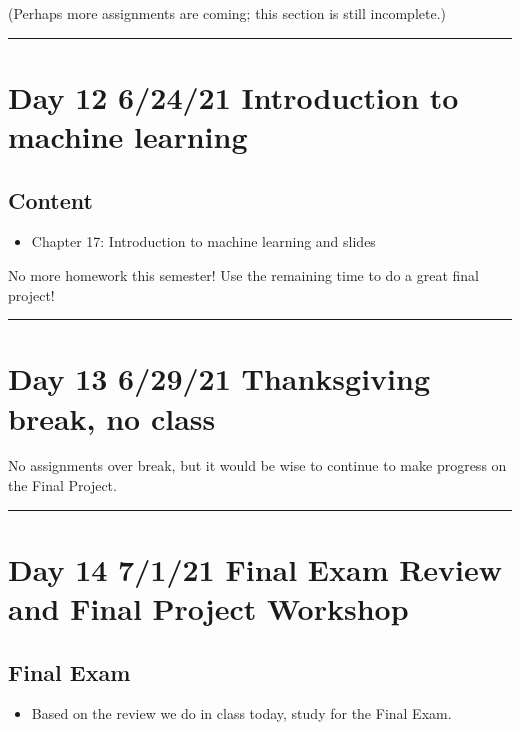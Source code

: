 \documentclass[letterpaper,10pt,english]{jupyterBook}
\begin{document}
\sphinxAtStartPar
(Perhaps more assignments are coming; this section is still incomplete.)


\bigskip\hrule\bigskip



\section{Day 12 \sphinxhyphen{} 6/24/21 \sphinxhyphen{} Introduction to machine learning}
\label{\detokenize{course-schedule:day-12-6-24-21-introduction-to-machine-learning}}

\subsection{Content}
\label{\detokenize{course-schedule:id21}}\begin{itemize}
\item {} 
\sphinxAtStartPar
Chapter 17: Introduction to machine learning \sphinxhyphen{} {\hyperref[\detokenize{chapter-17-machine-learning::doc}]{}} and slides

\end{itemize}

\sphinxAtStartPar
No more homework this semester!  Use the remaining time to do a great final project!


\bigskip\hrule\bigskip



\section{Day 13 \sphinxhyphen{} 6/29/21 \sphinxhyphen{} Thanksgiving break, no class}
\label{\detokenize{course-schedule:day-13-6-29-21-thanksgiving-break-no-class}}
\sphinxAtStartPar
No assignments over break, but it would be wise to continue to make progress on the Final Project.


\bigskip\hrule\bigskip



\section{Day 14 \sphinxhyphen{} 7/1/21 \sphinxhyphen{} Final Exam Review and Final Project Workshop}
\label{\detokenize{course-schedule:day-14-7-1-21-final-exam-review-and-final-project-workshop}}

\subsection{Final Exam}
\label{\detokenize{course-schedule:final-exam}}\begin{itemize}
\item {} 
\sphinxAtStartPar
Based on the review we do in class today, study for the Final Exam.

\end{itemize}
\end{document}
